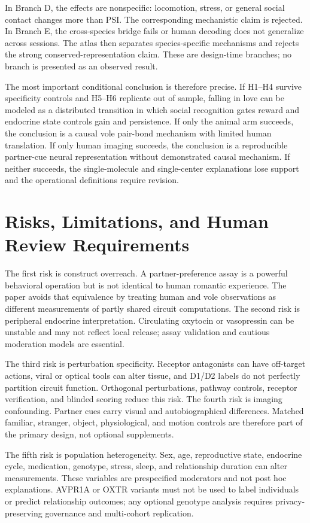 \documentclass[conference]{IEEEtran}
\begin{document}
In Branch D, the effects are nonspecific: locomotion, stress, or general social contact changes more than PSI. The corresponding mechanistic claim is rejected. In Branch E, the cross-species bridge fails or human decoding does not generalize across sessions. The atlas then separates species-specific mechanisms and rejects the strong conserved-representation claim. These are design-time branches; no branch is presented as an observed result.

The most important conditional conclusion is therefore precise. If H1--H4 survive specificity controls and H5--H6 replicate out of sample, falling in love can be modeled as a distributed transition in which social recognition gates reward and endocrine state controls gain and persistence. If only the animal arm succeeds, the conclusion is a causal vole pair-bond mechanism with limited human translation. If only human imaging succeeds, the conclusion is a reproducible partner-cue neural representation without demonstrated causal mechanism. If neither succeeds, the single-molecule and single-center explanations lose support and the operational definitions require revision.

\section{Risks, Limitations, and Human Review Requirements}
The first risk is construct overreach. A partner-preference assay is a powerful behavioral operation but is not identical to human romantic experience. The paper avoids that equivalence by treating human and vole observations as different measurements of partly shared circuit computations. The second risk is peripheral endocrine interpretation. Circulating oxytocin or vasopressin can be unstable and may not reflect local release; assay validation and cautious moderation models are essential.

The third risk is perturbation specificity. Receptor antagonists can have off-target actions, viral or optical tools can alter tissue, and D1/D2 labels do not perfectly partition circuit function. Orthogonal perturbations, pathway controls, receptor verification, and blinded scoring reduce this risk. The fourth risk is imaging confounding. Partner cues carry visual and autobiographical differences. Matched familiar, stranger, object, physiological, and motion controls are therefore part of the primary design, not optional supplements.

The fifth risk is population heterogeneity. Sex, age, reproductive state, endocrine cycle, medication, genotype, stress, sleep, and relationship duration can alter measurements. These variables are prespecified moderators and not post hoc explanations. AVPR1A or OXTR variants must not be used to label individuals or predict relationship outcomes; any optional genotype analysis requires privacy-preserving governance and multi-cohort replication.
\end{document}
